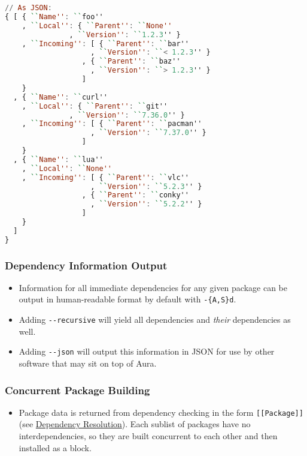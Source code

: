 \documentclass{article}
\begin{document}
\begin{shaded}
\begin{lstlisting}[language=haskell]
// As JSON:
{ [ { ``Name'': ``foo''
    , ``Local'': { ``Parent'': ``None''
               , ``Version'': ``1.2.3'' }
    , ``Incoming'': [ { ``Parent'': ``bar''
                    , ``Version'': ``< 1.2.3'' }
                  , { ``Parent'': ``baz''
                    , ``Version'': ``> 1.2.3'' }
                  ]
    }
  , { ``Name'': ``curl''
    , ``Local'': { ``Parent'': ``git''
               , ``Version'': ``7.36.0'' }
    , ``Incoming'': [ { ``Parent'': ``pacman''
                    , ``Version'': ``7.37.0'' }
                  ]
    }
  , { ``Name'': ``lua''
    , ``Local'': ``None''
    , ``Incoming'': [ { ``Parent'': ``vlc''
                    , ``Version'': ``5.2.3'' }
                  , { ``Parent'': ``conky''
                    , ``Version'': ``5.2.2'' }
                  ]
    }
  ]
}
\end{lstlisting}
\end{shaded}

\subsubsection{Dependency Information Output}\label{dependency-information-output}

\begin{itemize}
\itemsep1pt\parskip0pt
\item
  Information for all immediate dependencies for any given package can
  be output in human-readable format by default with \texttt{-\{A,S\}d}.
\item
  Adding \texttt{-\/-recursive} will yield all dependencies and
  \emph{their} dependencies as well.
\item
  Adding \texttt{-\/-json} will output this information in JSON for use
  by other software that may sit on top of Aura.
\end{itemize}

\subsubsection{Concurrent Package
Building}\label{concurrent-package-building}

\begin{itemize}
\itemsep1pt\parskip0pt
\item
  Package data is returned from dependency checking in the form
  \texttt{{[}{[}Package{]}{]}} (see
  \href{/DESIGN.md\#dependency-resolution}{Dependency Resolution}). Each
  sublist of packages have no interdependencies, so they are built
  concurrent to each other and then installed as a block.
\end{itemize}
\end{document}
